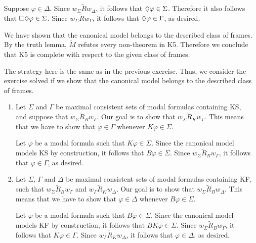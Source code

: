 \documentclass{article}
\begin{document}
\begin{ex}
\begin{enumerate}
Suppose $\varphi\in\Delta$. Since $w_\Sigma\mathbin{\tilde{R}}w_\Delta$, it 
follows that $\lozenge\varphi\in\Sigma$. Therefore it also follows that 
$\square\lozenge\varphi\in\Sigma$. Since $w_\Sigma\mathbin{\tilde{R}}w_\Gamma$, it
follows that $\lozenge\varphi\in\Gamma$, as desired.

We have shown that the canonical model belongs to the described class of 
frames. By the truth lemma, $\tilde{M}$ refutes every non-theorem in 
\textsf{K5}. Therefore we conclude that \textsf{K5} is complete with
respect to the given class of frames.
\end{enumerate}
\end{ex}

\begin{ex}
The strategy here is the same as in the previous exercise. Thus, we consider
the exercise solved if we show that the canonical model belongs to the described
class of frames.
\begin{enumerate}
\item Let $\Sigma$ and $\Gamma$ be maximal consistent sets of modal formulas
containing \textsf{KS}, and suppose that 
$w_\Sigma\mathbin{\tilde{R}_B}w_\Gamma$. Our goal is to show that
$w_\Sigma\mathbin{\tilde{R}_K}w_\Gamma$. This means that we have to show that
$\varphi\in\Gamma$ whenever $K\varphi\in\Sigma$.

Let $\varphi$ be a modal formula such that $K\varphi\in\Sigma$. Since the
canonical model models \textsf{KS} by construction, it follows that 
$B\varphi\in\Sigma$. Since $w_\Sigma\mathbin{\tilde{R}_B}w_\Gamma$, it follows 
that $\varphi\in\Gamma$, as desired.
\item Let $\Sigma$, $\Gamma$ and $\Delta$ be maximal consistent sets of modal
formulas containing \textsf{KF}, such that
$w_\Sigma\mathbin{\tilde{R}_B}w_\Gamma$ and
$w_\Gamma\mathbin{\tilde{R}_K}w_\Delta$. Our goal is to show that
$w_\Sigma\mathbin{\tilde{R}_B}w_\Delta$. This means that we have to show that
$\varphi\in\Delta$ whenever $B\varphi\in\Sigma$.

Let $\varphi$ be a modal formula such that $B\varphi\in\Sigma$. Since the
canonical model models \textsf{KF} by construction, it follows that
$BK\varphi\in\Sigma$. Since $w_\Sigma\mathbin{\tilde{R}_B}w_\Gamma$, it follows
that $K\varphi\in\Gamma$. Since $w_\Gamma\mathbin{\tilde{R}_K}w_\Delta$, it
follows that $\varphi\in\Delta$, as desired.
\end{enumerate}
\end{ex}
\end{document}
